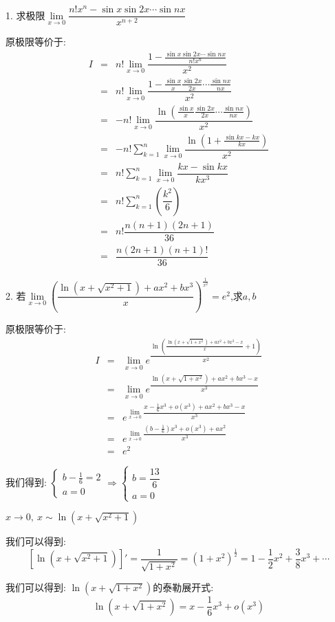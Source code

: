 1. 求极限$\lim\limits_{x\rightarrow 0}\dfrac{n!x^n-\sin x\sin 2x\cdots\sin nx}{x^{n+2}}$
\begin{solution}
	
	原极限等价于: 
	\begin{eqnarray*}
		I&=&n!\lim\limits_{x\rightarrow 0}\dfrac{1-\frac{\sin x\sin 2x\cdots\sin nx}{n!x^n}}{x^2}\\
		&=&n!\lim\limits_{x\rightarrow 0}\dfrac{1-\frac{\sin x}{x}\frac{\sin 2x}{2x}\cdots\frac{\sin nx}{nx}}{x^2}\\
		&=&-n!\lim\limits_{x\rightarrow 0}\dfrac{\ln(\frac{\sin x}{x}\frac{\sin 2x}{2x}\cdots\frac{\sin nx}{nx})}{x^2}\\
		&=&-n!\sum\limits_{k=1}^{n}\lim\limits_{x\rightarrow 0}\dfrac{\ln(1+\frac{\sin kx-kx}{kx})}{x^2}\\
		&=&n!\sum\limits_{k=1}^{n}\lim\limits_{x\rightarrow 0}\dfrac{kx-\sin kx}{kx^3}\\
		&=&n!\sum\limits_{k=1}^{n}(\dfrac{k^2}{6})\\
		&=&n!\dfrac{n(n+1)(2n+1)}{36}\\
		&=&\dfrac{n(2n+1)(n+1)!}{36}
	\end{eqnarray*}
\end{solution}

2. 若$\lim\limits_{x\rightarrow 0}\left(\dfrac{\ln(x+\sqrt{x^2+1})+ax^2+bx^3}{x} \right)^{\frac{1}{x^2}}=e^2$,求$a,b$
\begin{solution}
	
	原极限等价于: 
	\begin{eqnarray*}
		I&=&\lim\limits_{x\rightarrow 0}e^{\dfrac{\ln(\frac{\ln(x+\sqrt{1+x^2})+ax^2+bx^3-x}{x}+1)}{x^2}}\\
		&=&\lim\limits_{x\rightarrow 0}e^{\dfrac{\ln(x+\sqrt{1+x^2})+ax^2+bx^3-x}{x^3}}\\
		&=&e^{\lim\limits_{x\rightarrow 0}\dfrac{x-\frac{1}{6}x^3+o(x^3)+ax^2+bx^3-x}{x^3}}\\
		&=&e^{\lim\limits_{x\rightarrow 0}\dfrac{(b-\frac{1}{6})x^3+o(x^3)+ax^2}{x^3}}\\
		&=&e^2
	\end{eqnarray*}
	
	我们得到: $\left\lbrace
	\begin{array}{l}
		b-\frac{1}{6}=2\\
		a=0
	\end{array}
	\right. \Rightarrow \left\lbrace
	\begin{array}{l}
		b=\dfrac{13}{6}\\
		a=0
	\end{array}
	\right. $
\end{solution}
\begin{anymark}[注]
	$x\rightarrow 0,\ x\sim \ln(x+\sqrt{x^2+1})$
	
	我们可以得到: 
	$$[\ln(x+\sqrt{x^2+1})]'=\dfrac{1}{\sqrt{1+x^2}}=(1+x^2)^{\frac{1}{2}}=1-\dfrac{1}{2}x^2+\dfrac{3}{8}x^3+\cdots$$
	
	我们可以得到: $\ln(x+\sqrt{1+x^2})$的泰勒展开式: 
	$$\ln(x+\sqrt{1+x^2})=x-\dfrac{1}{6}x^3+o(x^3)$$
\end{anymark}

